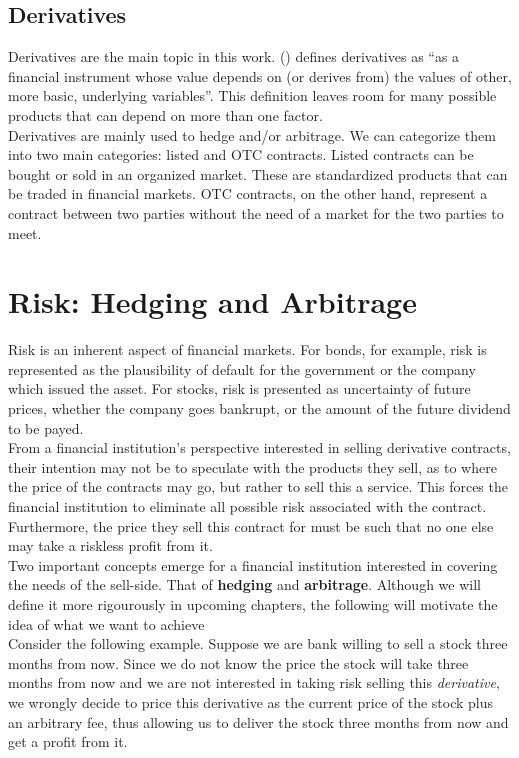 \documentclass[11pt]{report}
\newcommand{\aycite}[1]{%
 \citeauthor{#1} (\citeyear{#1})}
\begin{document}
\subsection{Derivatives}
Derivatives are the main topic in this work. \aycite{hull} defines derivatives as ``as a financial instrument whose value depends on (or derives from) the values of other, more basic, underlying variables''. This definition leaves room for many possible products that can depend on more than one factor.\\

Derivatives are mainly used to hedge and/or arbitrage. We can categorize them into two main categories: listed and OTC contracts. Listed contracts can be bought or sold in an organized market. These are standardized products that can be traded in financial markets. OTC contracts, on the other hand, represent a contract between two parties without the need of a market for the two parties to meet.

\section{Risk: Hedging and Arbitrage}
Risk is an inherent aspect of financial markets. For bonds, for example, risk is represented as the plausibility of default for the government or the company which issued the asset. For stocks, risk is presented as uncertainty of future prices, whether the company goes bankrupt, or the amount of the future dividend to be payed.\\

From a financial institution's perspective interested in selling derivative contracts, their intention may not be to speculate with the products they sell, as to where the price of the contracts may go, but rather to sell this a service. This forces the financial institution to eliminate all possible risk associated with the contract. Furthermore, the price they sell this contract for must be such that no one else may take a riskless profit from it.\\

Two important concepts emerge for a financial institution interested in covering the needs of the sell-side. That of \textbf{hedging} and \textbf{arbitrage}. Although we will define it more rigourously in upcoming chapters, the following will motivate the idea of what we want to achieve\\

 Consider the following example. Suppose we are bank willing to sell a stock three months from now. Since we do not know the price the stock will take three months from now and we are not interested in taking risk selling this \textit{derivative}, we wrongly decide to price this derivative as the current price of the stock plus an arbitrary fee, thus allowing us to deliver the stock three months from now and get a profit from it.\\
 
\end{document}
